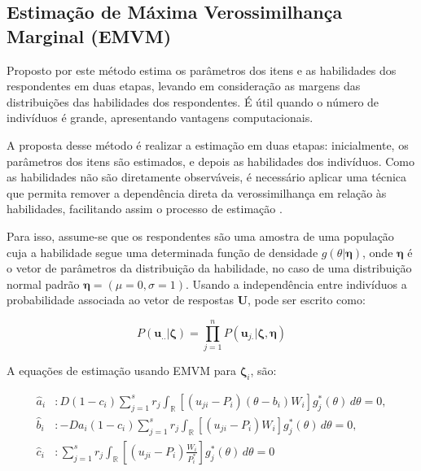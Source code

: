 \subsection{Estimação de Máxima Verossimilhança Marginal (EMVM)}

Proposto por  este método estima os parâmetros dos itens e as habilidades dos respondentes em duas etapas, levando em consideração as margens das distribuições das habilidades dos respondentes. É útil quando o número de indivíduos é grande, apresentando vantagens computacionais.

A proposta desse método é realizar a estimação em duas etapas: inicialmente, os parâmetros dos itens são estimados, e depois as habilidades dos indivíduos. Como as habilidades não são diretamente observáveis, é necessário aplicar uma técnica que permita remover a dependência direta da verossimilhança em relação às habilidades, facilitando assim o processo de estimação \cite{de2000teoria}.

Para isso, assume-se que os respondentes são uma amostra de uma população cuja a habilidade segue uma determinada função de densidade $g(\theta|\boldsymbol{\eta})$, onde $\boldsymbol{\eta}$ é o vetor de parâmetros da distribuição da habilidade, no caso de uma distribuição normal padrão $\boldsymbol{\eta} = (\mu = 0, \sigma = 1) $. Usando a independência entre indivíduos a probabilidade associada ao vetor de respostas $\boldsymbol{U}$, pode ser escrito como:

\[
P(\boldsymbol{u}_{..}|\boldsymbol{\zeta}) = \prod_{j=1}^{n}P(\boldsymbol{u}_{j.}|\boldsymbol{\zeta}, \boldsymbol{\eta})
\]

A equações de estimação usando EMVM para $ \boldsymbol{\zeta}_i$, são:\\

\begin{comment}

\[
\hat{a}_i : D(1-c_i)\sum_{j=1}^{s}r_j
\int_{\mathbb{R}}\left[(u_{ji} - P_i)(\theta - b_i)W_i\right] g_j^*(\theta)d\theta = 0,
\]

\[
\hat{b}_i : -Da_i(1-c_i)\sum_{j=1}^{s}r_j
\int_{\mathbb{R}}\left[(u_{ji} - P_i)W_i \right] g_j^*(\theta)d\theta = 0,
\]

\[
\hat{c}_i : \sum_{j=1}^{s}r_j \int_{\mathbb{R}}
\left[(u_{ji}  - P_i)\frac{W_i}{P^*_i}\right]
g_j^*(\theta)d\theta = 0
\]
\end{comment}


\[
\begin{aligned}
	\hat{a}_i & : D(1 - c_i) \sum_{j=1}^{s} r_j
	\int_{\mathbb{R}} \left[(u_{ji} - P_i)(\theta - b_i)W_i\right] g_j^*(\theta) \, d\theta = 0, \\[1em]	
	\hat{b}_i & : -D a_i (1 - c_i) \sum_{j=1}^{s} r_j
	\int_{\mathbb{R}} \left[(u_{ji} - P_i)W_i \right] g_j^*(\theta) \, d\theta = 0, \\[1em]	
	\hat{c}_i & : \sum_{j=1}^{s} r_j \int_{\mathbb{R}}
	\left[(u_{ji} - P_i)\frac{W_i}{P^*_i}\right]
	g_j^*(\theta) \, d\theta = 0
\end{aligned}
\]

